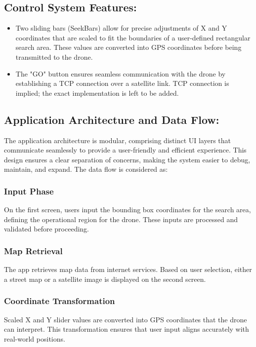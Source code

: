 \documentclass[conference]{IEEEtran}
\begin{document}
\subsection{Control System Features:}

\begin{itemize}
    \item Two sliding bars (SeekBars) allow for precise adjustments of X and Y coordinates that are scaled to fit the boundaries of a user-defined rectangular search area. These values are converted into GPS coordinates before being transmitted to the drone.
    \item The "GO" button ensures seamless communication with the drone by establishing a TCP connection over a satellite link. TCP connection is implied; the exact implementation is left to be added. 
\end{itemize}


\subsection{Application Architecture and Data Flow:}


The application architecture is modular, comprising distinct UI layers that communicate seamlessly to provide a user-friendly and efficient experience. This design ensures a clear separation of concerns, making the system easier to debug, maintain, and expand. The data flow is considered as:

\subsubsection{Input Phase}

 On the first screen, users input the bounding box coordinates for the search area, defining the operational region for the drone. These inputs are processed and validated before proceeding.
 
\subsubsection{Map Retrieval} 
The app retrieves map data from internet services. Based on user selection, either a street map or a satellite image is displayed on the second screen.


\subsubsection{Coordinate Transformation}
Scaled X and Y slider values are converted into GPS coordinates that the drone can interpret. This transformation ensures that user input aligns accurately with real-world positions.
\end{document}
